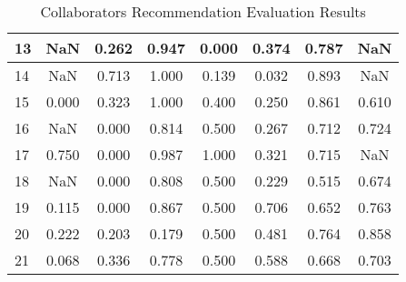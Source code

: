 \begin{table}[htbp]
\begin{tabularx}{\textwidth}{|X|c|c|c|c|c|c|c|}
        \hline
        13 & NaN & 0.262 & 0.947 & 0.000 & 0.374 & 0.787 & NaN \\
        \hline
        14 & NaN & 0.713 & 1.000 & 0.139 & 0.032 & 0.893 & NaN \\
        \hline
        15 & 0.000 & 0.323 & 1.000 & 0.400 & 0.250 & 0.861 & 0.610 \\
        \hline
        16 & NaN & 0.000 & 0.814 & 0.500 & 0.267 & 0.712 & 0.724 \\
        \hline
        17 & 0.750 & 0.000 & 0.987 & 1.000 & 0.321 & 0.715 & NaN \\
        \hline
        18 & NaN & 0.000 & 0.808 & 0.500 & 0.229 & 0.515 & 0.674 \\
        \hline
        19 & 0.115 & 0.000 & 0.867 & 0.500 & 0.706 & 0.652 & 0.763 \\
        \hline
        20 & 0.222 & 0.203 & 0.179 & 0.500 & 0.481 & 0.764 & 0.858 \\
        \hline
        21 & 0.068 & 0.336 & 0.778 & 0.500 & 0.588 & 0.668 & 0.703 \\
        \hline
    \end{tabularx}
    \caption{Collaborators Recommendation Evaluation Results}
    \label{table:collaborators-recommendation-evaluation-results}
\end{table}

